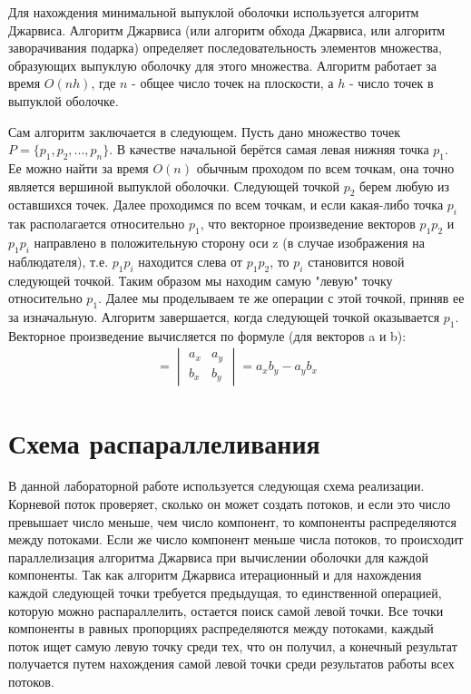 \documentclass{report}
\begin{document}
\par Для нахождения минимальной выпуклой оболочки используется алгоритм Джарвиса. Алгоритм Джарвиса (или алгоритм обхода Джарвиса, или алгоритм заворачивания подарка) определяет последовательность элементов множества, образующих выпуклую оболочку для этого множества. Алгоритм работает за время $O(nh)$, где $n$ - общее число точек на плоскости, а $h$ - число точек в выпуклой оболочке.
\par Сам алгоритм заключается в следующем. Пусть дано множество точек $P = \{p_1, p_2, ..., p_n\}$. В качестве начальной берётся самая левая нижняя точка $p_1$. Ее можно найти за время $O(n)$ обычным проходом по всем точкам, она точно является вершиной выпуклой оболочки. Следующей точкой $p_2$ берем любую из оставшихся точек. Далее проходимся по всем точкам, и если какая-либо точка $p_i$ так располагается относительно $p_1$, что векторное произведение векторов $p_1p_2$ и $p_1p_i$ направлено в положительную сторону оси z (в случае изображения на наблюдателя), т.е. $p_1p_i$ находится слева от $p_1p_2$, то $p_i$ становится новой следующей точкой. Таким образом мы находим самую "левую" точку относительно $p_1$. Далее мы проделываем те же операции с этой точкой, приняв ее за изначальную. Алгоритм завершается, когда следующей точкой оказывается $p_1$. Векторное произведение вычисляется по формуле (для векторов a и b):
\begin{gather}
[\vec{a}, \vec{b}] = \begin{vmatrix}a_x & a_y \\ b_x & b_y \end{vmatrix} = a_xb_y - a_yb_x
\end{gather}

\section*{Схема распараллеливания}
\par В данной лабораторной работе используется следующая схема реализации. Корневой поток проверяет, сколько он может создать потоков, и если это число превышает число меньше, чем число компонент, то компоненты распределяются между потоками. Если же число компонент меньше числа потоков, то происходит параллелизация алгоритма Джарвиса при вычислении оболочки для каждой компоненты. Так как алгоритм Джарвиса итерационный и для нахождения каждой следующей точки требуется предыдущая, то единственной операцией, которую можно распараллелить, остается поиск самой левой точки. Все точки компоненты в равных пропорциях распределяются между потоками, каждый поток ищет самую левую точку среди тех, что он получил, а конечный результат получается путем нахождения самой левой точки среди результатов работы всех потоков.
\newpage
\end{document}
